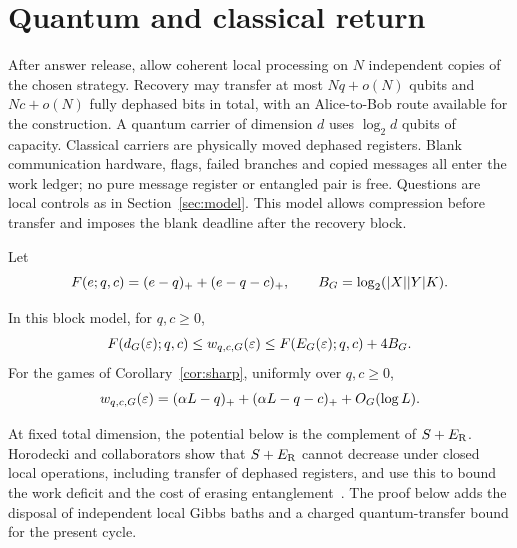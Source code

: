 \section{Quantum and classical return}\label{sec:recovery}
After answer release, allow coherent local processing on $N$ independent copies of the chosen strategy. Recovery may transfer at most $Nq+o(N)$ qubits and $Nc+o(N)$ fully dephased bits in total, with an Alice-to-Bob route available for the construction. A quantum carrier of dimension $d$ uses $\log_2d$ qubits of capacity. Classical carriers are physically moved dephased registers. Blank communication hardware, flags, failed branches and copied messages all enter the work ledger; no pure message register or entangled pair is free. Questions are local controls as in Section~\ref{sec:model}. This model allows compression before transfer and imposes the blank deadline after the recovery block.

Let
\[
 F(e;q,c)=(e-q)_++(e-q-c)_+,\qquad
 B_G=\log_2(|X||Y|K).
\]
\begin{theorem}\label{thm:return}
In this block model, for $q,c\ge0$,
\begin{equation}
 F(d_G(\varepsilon);q,c)\le w_{q,c,G}(\varepsilon)
 \le F(E_G(\varepsilon);q,c)+4B_G.\label{eq:return}
\end{equation}
For the games of Corollary~\ref{cor:sharp}, uniformly over $q,c\ge0$,
\begin{equation}
 w_{q,c,G}(\varepsilon)
 =(\alpha L-q)_++(\alpha L-q-c)_++O_G(\log L).
 \label{eq:returnsharp}
\end{equation}
\end{theorem}

At fixed total dimension, the potential below is the complement of $S+E_{\mathrm R}$. Horodecki and collaborators show that $S+E_{\mathrm R}$ cannot decrease under closed local operations, including transfer of dephased registers, and use this to bound the work deficit and the cost of erasing entanglement~\cite[Theorems 2 and 3 and the proof of Theorem 3]{localnonlocal}. The proof below adds the disposal of independent local Gibbs baths and a charged quantum-transfer bound for the present cycle.

